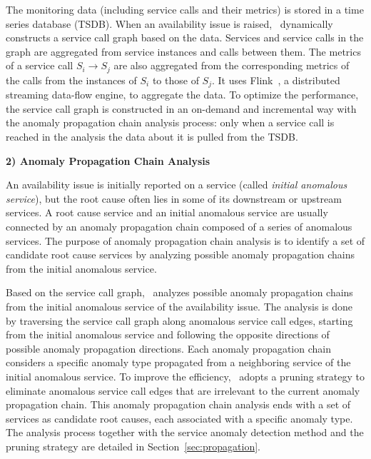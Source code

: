 The monitoring data (including service calls and their metrics) is stored in a time series database (TSDB).
When an availability issue is raised, \app~dynamically constructs a service call graph based on the data.
Services and service calls in the graph are aggregated from service instances and calls between them.
The metrics of a service call $S_i \rightarrow S_j$ are also aggregated from the corresponding metrics of the calls from the instances of $S_i$ to those of $S_j$.
It uses Flink~\cite{flink}, a distributed streaming data-flow engine, to aggregate the data.
To optimize the performance, the service call graph is constructed in an on-demand and incremental way with the anomaly propagation chain analysis process:
only when a service call is reached in the analysis the data about it is pulled from the TSDB.

\textbf{2) Anomaly Propagation Chain Analysis}

An availability issue is initially reported on a service (called \textit{initial anomalous service}), but the root cause often lies in some of its downstream or upstream services.
A root cause service and an initial anomalous service are usually connected by an anomaly propagation chain composed of a series of anomalous services.
The purpose of anomaly propagation chain analysis is to identify a set of candidate root cause services by analyzing possible anomaly propagation chains from the initial anomalous service.

Based on the service call graph, \app~analyzes possible anomaly propagation chains from the initial anomalous service of the availability issue.
The analysis is done by traversing the service call graph along anomalous service call edges, starting from the initial anomalous service and following the opposite directions of possible anomaly propagation directions.
Each anomaly propagation chain considers a specific anomaly type propagated from a neighboring service of the initial anomalous service.
To improve the efficiency, \app~adopts a pruning strategy to eliminate anomalous service call edges that are irrelevant to the current anomaly propagation chain.
This anomaly propagation chain analysis ends with a set of services as candidate root causes, each associated with a specific anomaly type.
The analysis process together with the service anomaly detection method and the pruning strategy are detailed in Section~\ref{sec:propagation}.

